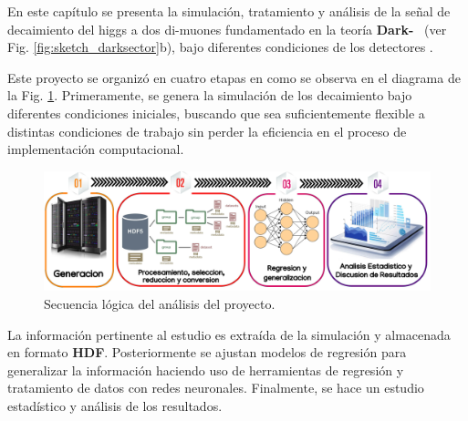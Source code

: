 %

En este capítulo se presenta la simulación, tratamiento y análisis de la señal de decaimiento del higgs a dos di-muones fundamentado en la teoría \textbf{Dark-}\SUSY~ (ver Fig. \ref{fig:sketch_darksector}b), bajo diferentes condiciones de los detectores \CMS. 


Este proyecto se organizó en cuatro etapas en como se observa en el diagrama de la Fig. \ref{procesos_darksusy}. Primeramente, se genera la simulación de los decaimiento bajo diferentes condiciones iniciales, buscando que sea suficientemente flexible a distintas condiciones de trabajo sin perder la eficiencia en el proceso de implementación computacional.
\begin{figure}[!b]
\centering
\includegraphics[width=1\textwidth]{Simulacion/imagenes/procesos_darksusy.png}
\caption{Secuencia lógica del análisis del proyecto.}
\label{procesos_darksusy}
\end{figure}
La información pertinente al estudio es extraída de la simulación y almacenada en formato \textbf{HDF}. Posteriormente se ajustan modelos de regresión para generalizar la información haciendo uso de herramientas de regresión y tratamiento de datos con redes neuronales. Finalmente, se hace un estudio estadístico y análisis de los resultados.




